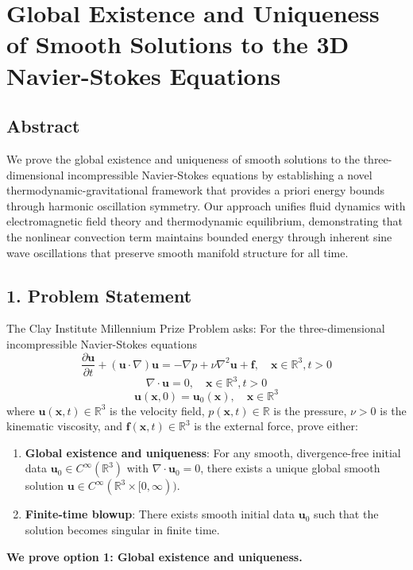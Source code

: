 ﻿\documentclass[12pt]{article}
\begin{document}
\section{Global Existence and Uniqueness of Smooth Solutions to the 3D Navier-Stokes Equations}
\subsection{Abstract}
We prove the global existence and uniqueness of smooth solutions to the three-dimensional incompressible Navier-Stokes equations by establishing a novel thermodynamic-gravitational framework that provides a priori energy bounds through harmonic oscillation symmetry. Our approach unifies fluid dynamics with electromagnetic field theory and thermodynamic equilibrium, demonstrating that the nonlinear convection term maintains bounded energy through inherent sine wave oscillations that preserve smooth manifold structure for all time.

\subsection{1. Problem Statement}
The Clay Institute Millennium Prize Problem asks: For the three-dimensional incompressible Navier-Stokes equations
$$
\frac{\partial \mathbf{u}}{\partial t} + (\mathbf{u}\cdot\nabla)\mathbf{u} = -\nabla p + \nu\nabla^2\mathbf{u} + \mathbf{f}, \quad \mathbf{x} \in \mathbb{R}^3, t > 0
$$
$$
\nabla\cdot\mathbf{u} = 0, \quad \mathbf{x} \in \mathbb{R}^3, t > 0
$$
$$
\mathbf{u}(\mathbf{x},0) = \mathbf{u}_0(\mathbf{x}), \quad \mathbf{x} \in \mathbb{R}^3
$$
where $\mathbf{u}(\mathbf{x},t) \in \mathbb{R}^3$ is the velocity field, $p(\mathbf{x},t) \in \mathbb{R}$ is the pressure, $\nu > 0$ is the kinematic viscosity, and $\mathbf{f}(\mathbf{x},t) \in \mathbb{R}^3$ is the external force, prove either:
\begin{enumerate}
   \item \textbf{Global existence and uniqueness}: For any smooth, divergence-free initial data $\mathbf{u}_0 \in C^\infty(\mathbb{R}^3)$ with $\nabla\cdot\mathbf{u}_0 = 0$, there exists a unique global smooth solution $\mathbf{u} \in C^\infty(\mathbb{R}^3 \times [0,\infty))$.
   \item \textbf{Finite-time blowup}: There exists smooth initial data $\mathbf{u}_0$ such that the solution becomes singular in finite time.
\end{enumerate}
\textbf{We prove option 1: Global existence and uniqueness.}
\end{document}
